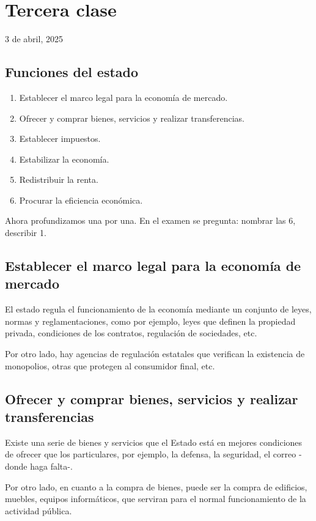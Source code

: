 \section{Tercera clase}

3 de abril, 2025

\subsection{Funciones del estado}

\begin{enumerate}
    \item Establecer el marco legal para la economía de mercado.
    \item Ofrecer y comprar bienes, servicios y realizar transferencias.
    \item Establecer impuestos.
    \item Estabilizar la economía.
    \item Redistribuir la renta.
    \item Procurar la eficiencia económica.
\end{enumerate}

Ahora profundizamos una por una.
En el examen se pregunta: nombrar las 6, describir 1.

\subsection{Establecer el marco legal para la economía de mercado}

El estado regula el funcionamiento de la economía mediante un conjunto de leyes,
normas y reglamentaciones, como por ejemplo, leyes que definen la propiedad privada,
condiciones de los contratos, regulación de sociedades, etc.

Por otro lado, hay agencias de regulación estatales que verifican la existencia de monopolios,
otras que protegen al consumidor final, etc.

\subsection{Ofrecer y comprar bienes, servicios y realizar transferencias}

Existe una serie de bienes y servicios que el Estado está en mejores condiciones de ofrecer que los particulares,
por ejemplo, la defensa, la seguridad, el correo -donde haga falta-.

Por otro lado, en cuanto a la compra de bienes,
puede ser la compra de edificios,
muebles, equipos informáticos,
que serviran para el normal funcionamiento de la actividad pública.

